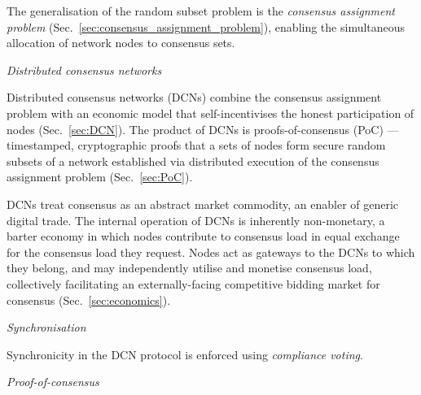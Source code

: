 The generalisation of the random subset problem is the \emph{consensus assignment problem} (Sec.~\ref{sec:consensus_assignment_problem}), enabling the simultaneous allocation of network nodes to consensus sets.

\begin{center}
	\resizebox{!}{0.5\columnwidth}{}
	\hspace{1.5em}
	\resizebox{!}{0.5\columnwidth}{}
\end{center}

\begin{center}\emph{Distributed consensus networks}\end{center}

Distributed consensus networks (DCNs) combine the consensus assignment problem with an economic model that self-incentivises the honest participation of nodes (Sec.~\ref{sec:DCN}). The product of DCNs is proofs-of-consensus (PoC) --- timestamped, cryptographic proofs that a sets of nodes form secure random subsets of a network established via distributed execution of the consensus assignment problem (Sec.~\ref{sec:PoC}).

DCNs treat consensus as an abstract market commodity, an enabler of generic digital trade. The internal operation of DCNs is inherently non-monetary, a barter economy in which nodes contribute to consensus load in equal exchange for the consensus load they request. Nodes act as gateways to the DCNs to which they belong, and may independently utilise and monetise consensus load, collectively facilitating an externally-facing competitive bidding market for consensus (Sec.~\ref{sec:economics}).

\begin{center}
	\resizebox{0.8\columnwidth}{!}{}
\end{center}

\begin{center}\emph{Synchronisation}\end{center}

Synchronicity in the DCN protocol is enforced using \emph{compliance voting}.

\begin{center}\emph{Proof-of-consensus}\end{center}

\begin{center}
	\resizebox{0.5\columnwidth}{!}{}
\end{center}

